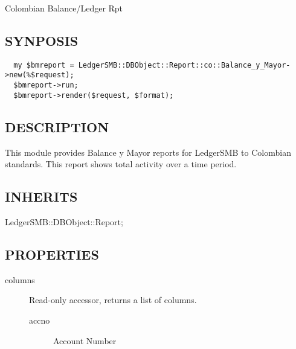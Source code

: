\begin{description}
\begin{description}
\begin{description}
\begin{description}
\begin{description}
\begin{description}
\begin{description}
\begin{description}
\begin{description}
\begin{description}
Colombian Balance/Ledger Rpt

\subsection*{SYNPOSIS\label{LedgerSMB::DBObject::Report::co::Balance_y_Mayor_SYNPOSIS}}
\begin{verbatim}
  my $bmreport = LedgerSMB::DBObject::Report::co::Balance_y_Mayor->new(%$request);
  $bmreport->run;
  $bmreport->render($request, $format);
\end{verbatim}
\subsection*{DESCRIPTION\label{LedgerSMB::DBObject::Report::co::Balance_y_Mayor_DESCRIPTION}}


This module provides Balance y Mayor reports for LedgerSMB to Colombian 
standards. This report shows total activity over a time period.

\subsection*{INHERITS\label{LedgerSMB::DBObject::Report::co::Balance_y_Mayor_INHERITS}}
\begin{description}

\item[{LedgerSMB::DBObject::Report;}] \mbox{}\end{description}
\subsection*{PROPERTIES\label{LedgerSMB::DBObject::Report::co::Balance_y_Mayor_PROPERTIES}}
\begin{description}

\item[{columns}] \mbox{}

Read-only accessor, returns a list of columns.

\begin{description}

\item[{accno}] \mbox{}

Account Number



\end{description}
\end{description}
\end{description}
\end{description}
\end{description}
\end{description}
\end{description}
\end{description}
\end{description}
\end{description}
\end{description}
\end{description}
